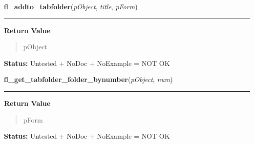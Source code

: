     \label{xformslib:library:fl_addto_tabfolder}

    \vspace{0.5ex}

\hspace{.8\funcindent}\begin{boxedminipage}{\funcwidth}

    \raggedright \textbf{fl\_addto\_tabfolder}(\textit{pObject}, \textit{title}, \textit{pForm})

    \vspace{-1.5ex}

    \rule{\textwidth}{0.5\fboxrule}
\setlength{\parskip}{2ex}
\setlength{\parskip}{1ex}
      \textbf{Return Value}
    \vspace{-1ex}

      \begin{quote}
      pObject

      \end{quote}

\textbf{Status:} Untested + NoDoc + NoExample = NOT OK



    \end{boxedminipage}

    \label{xformslib:library:fl_get_tabfolder_folder_bynumber}

    \vspace{0.5ex}

\hspace{.8\funcindent}\begin{boxedminipage}{\funcwidth}

    \raggedright \textbf{fl\_get\_tabfolder\_folder\_bynumber}(\textit{pObject}, \textit{num})

    \vspace{-1.5ex}

    \rule{\textwidth}{0.5\fboxrule}
\setlength{\parskip}{2ex}
\setlength{\parskip}{1ex}
      \textbf{Return Value}
    \vspace{-1ex}

      \begin{quote}
      pForm

      \end{quote}

\textbf{Status:} Untested + NoDoc + NoExample = NOT OK



    \end{boxedminipage}

